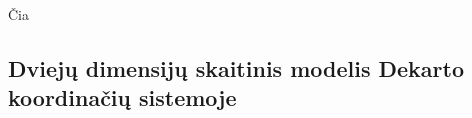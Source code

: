 \documentclass{VUMIFInfKursinis}
\begin{document}
Čia 

\subsection{Dviejų dimensijų skaitinis modelis Dekarto koordinačių sistemoje}



\printbibliography[heading=bibintoc] %

\appendix  %

\end{document}
